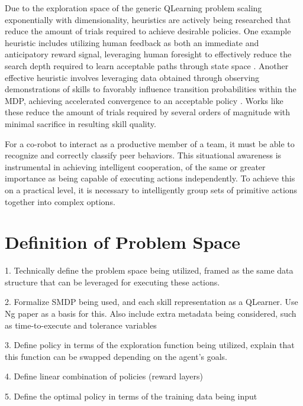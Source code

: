 \documentclass[letterpaper]{article}
\begin{document}
Due to the exploration space of the generic QLearning problem scaling exponentially with dimensionality, heuristics are actively being researched that reduce the amount of trials required to achieve desirable policies. One example heuristic includes utilizing human feedback as both an immediate and anticipatory reward signal, leveraging human foresight to effectively reduce the search depth required to learn acceptable paths through state space \cite{TAMER}. Another effective heuristic involves leveraging data obtained through observing demonstrations of skills to favorably influence transition probabilities within the MDP, achieving accelerated convergence to an acceptable policy \cite{LFDSurvey}. Works like these reduce the amount of trials required by several orders of magnitude with minimal sacrifice in resulting skill quality.

For a co-robot to interact as a productive member of a team, it must be able to recognize and correctly classify peer behaviors. This situational awareness is instrumental in achieving intelligent cooperation, of the same or greater importance as being capable of executing actions independently. To achieve this on a practical level, it is necessary to intelligently group sets of primitive actions together into complex options. 

\section{Definition of Problem Space}
\label{sec:pspace}

1. Technically define the problem space being utilized, framed as the same data structure that
   can be leveraged for executing these actions. 

2. Formalize SMDP being used, and each skill representation as a QLearner. Use Ng paper as a basis for this. Also include extra metadata
   being considered, such as time-to-execute and tolerance variables

3. Define policy in terms of the exploration function being utilized, explain that this function can be swapped
   depending on the agent's goals.

4. Define linear combination of policies (reward layers)

5. Define the optimal policy in terms of the training data being input
\end{document}
